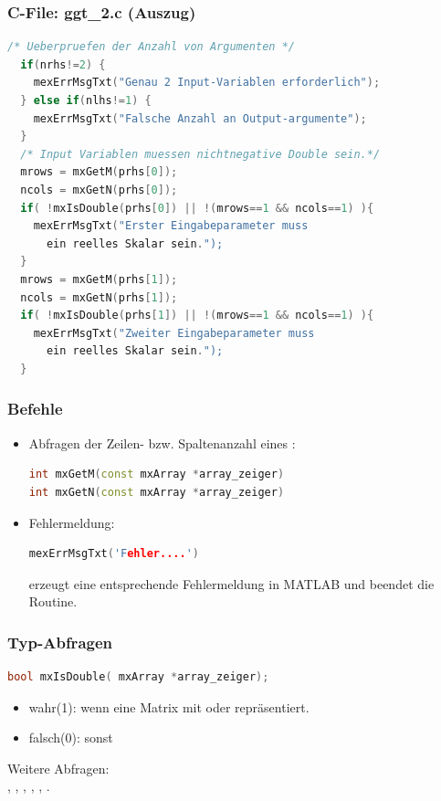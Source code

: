 \documentclass[hyperref={xetex}]{beamer}
\begin{document}
%
% 
\begin{frame}[fragile]\frametitle{C-File: ggt\_2.c (Auszug)}
\begin{lstlisting}[language=C++]
/* Ueberpruefen der Anzahl von Argumenten */
  if(nrhs!=2) {
    mexErrMsgTxt("Genau 2 Input-Variablen erforderlich");
  } else if(nlhs!=1) {
    mexErrMsgTxt("Falsche Anzahl an Output-argumente");
  }
  /* Input Variablen muessen nichtnegative Double sein.*/
  mrows = mxGetM(prhs[0]);
  ncols = mxGetN(prhs[0]);
  if( !mxIsDouble(prhs[0]) || !(mrows==1 && ncols==1) ){
    mexErrMsgTxt("Erster Eingabeparameter muss 
      ein reelles Skalar sein.");
  }
  mrows = mxGetM(prhs[1]);
  ncols = mxGetN(prhs[1]);
  if( !mxIsDouble(prhs[1]) || !(mrows==1 && ncols==1) ){
    mexErrMsgTxt("Zweiter Eingabeparameter muss 
      ein reelles Skalar sein.");
  } 
\end{lstlisting}
\end{frame}
%
%
\begin{frame}[fragile]\frametitle{Befehle}
\begin{itemize}
\item Abfragen der Zeilen- bzw. Spaltenanzahl eines :
\begin{lstlisting}[language=C++]
int mxGetM(const mxArray *array_zeiger)
int mxGetN(const mxArray *array_zeiger)
\end{lstlisting}
\item Fehlermeldung:
\begin{lstlisting}[language=C++]
mexErrMsgTxt('Fehler....')
\end{lstlisting}
erzeugt eine entsprechende Fehlermeldung in MATLAB und beendet die Routine. 
\end{itemize}
\end{frame}
%
%
\begin{frame}[fragile]\frametitle{Typ-Abfragen}
\begin{lstlisting}[language=C++]
bool mxIsDouble( mxArray *array_zeiger);
\end{lstlisting}
\begin{itemize}
 \item wahr(1): wenn  eine Matrix mit  oder
 repr\"asentiert.
\item falsch(0): sonst
\end{itemize}

\alert{Weitere Abfragen:}  \\
, ,
, , , .
\end{frame}
\end{document}

